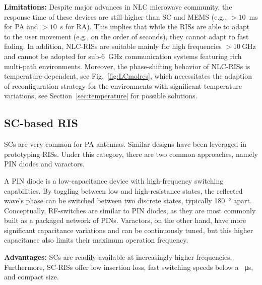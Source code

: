 {\bf Limitations:} Despite major advances in \gls{NLC} microwave community, the response time of these devices are still higher than \gls{SC} and \gls{MEMS} (e.g., $>10$~ms for \gls{PA} and {$>10$~s} for \gls{RA}). This implies that while the \glspl{RIS} are able to adapt to the user movement (e.g., on the order of seconds), they cannot adapt to fast fading. In addition, \gls{NLC}-\glspl{RIS} are suitable mainly for high frequencies $>10\ $GHz and cannot be adopted for  sub-$6$~GHz communication systems featuring rich multi-path environments. Moreover, the phase-shifting behavior of \gls{NLC}-\glspl{RIS} is temperature-dependent, see Fig.~\ref{fig:LCmolres}, which necessitates the adaption of reconfiguration strategy for the environments with significant temperature variations, see Section~\ref{sec:temperature} for possible solutions. 

\subsection{\gls{SC}-based \gls{RIS}}
\glspl{SC} are very common for \gls{PA} antennas. Similar  designs have been leveraged in prototyping \glspl{RIS}. Under this category, there are two common approaches, namely \gls{PIN} diodes and varactors. %

A \gls{PIN} diode is a low-capacitance device with high-frequency switching capabilities. By toggling between low and high-resistance states, the reflected wave's phase can be switched between two discrete states, typically \SI{180}{\degree} apart. Conceptually, \gls{RF}-switches are similar to \gls{PIN} diodes, as they are most commonly built as a packaged network of \glspl{PIN}. Varactors, on the other hand, have more significant capacitance variations and can be continuously tuned, but this higher capacitance also limits their maximum operation frequency.

{\bf Advantages:} \glspl{SC} are readily available at increasingly higher frequencies. Furthermore, \gls{SC}-\glspl{RIS} offer low insertion loss, fast switching speeds below a \SI{}{\micro\second}, and compact size.


